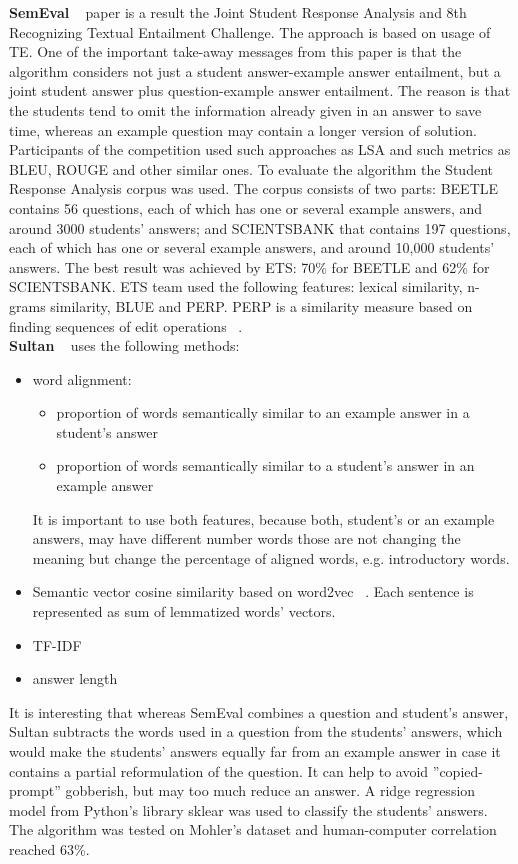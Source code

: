 \textbf{SemEval} ~\cite{SemEval} paper is a result the Joint Student Response Analysis and 8th Recognizing Textual Entailment Challenge. The approach is based on usage of TE. One of the important take-away messages from this paper is that the algorithm considers not just a student answer-example answer entailment, but a joint student answer plus question-example answer entailment. The reason is that the students tend to omit the information already given in an answer to save time, whereas an example question may contain a longer version of solution. Participants of the competition used such approaches as LSA and such metrics as BLEU, ROUGE and other similar ones. To evaluate the algorithm the Student Response Analysis corpus was used. The corpus consists of two parts: BEETLE contains 56 questions, each of which has one or several example answers, and around 3000 students' answers; and SCIENTSBANK that contains 197 questions, each of which has one or several example answers, and around 10,000 students' answers. The best result was achieved by ETS: 70\% for BEETLE and 62\% for SCIENTSBANK. ETS team used the following features: lexical similarity, n-grams similarity, BLUE and PERP. PERP is a similarity measure based on finding sequences of edit operations ~\cite{Heilman}.\\

\textbf{Sultan} ~\cite{Sultan} uses the following methods:
\begin{itemize}
\item word alignment:
\begin{itemize}
\item proportion of words semantically similar to an example answer in a student's answer
\item proportion of words semantically similar to a student's answer in an example answer
\end{itemize}
It is important to use both features, because both, student's or an example answers, may have different number words those are not changing the meaning but change the percentage of aligned words, e.g. introductory words. 
\item Semantic vector cosine similarity based on word2vec ~\cite{Baroni}. Each sentence is represented as sum of lemmatized words' vectors.
\item TF-IDF
\item answer length
\end{itemize} 

It is interesting that whereas SemEval combines a question and student's answer, Sultan subtracts the words used in a question from the students' answers, which would make the students' answers equally far from an example answer in case it contains a partial reformulation of the question. It can help to avoid ”copied-prompt” gobberish, but may too much reduce an answer. A ridge regression model from Python's library sklear was used to classify the students' answers. The algorithm was tested on Mohler's dataset and human-computer correlation reached 63\%.\\


